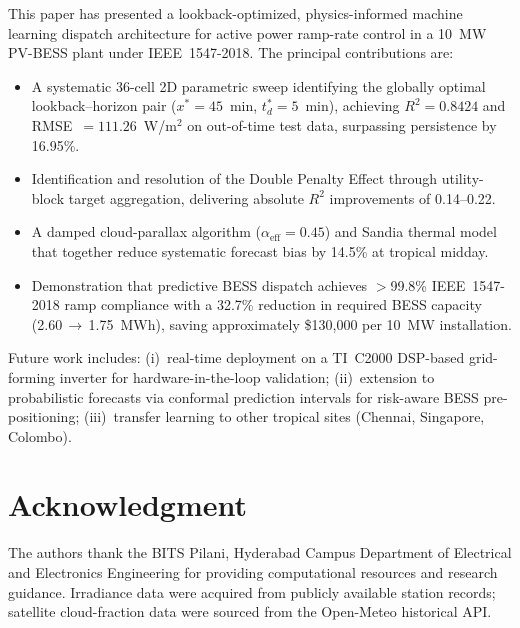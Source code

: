 \documentclass[conference]{IEEEtran}
\begin{document}
This paper has presented a lookback-optimized, physics-informed machine learning
dispatch architecture for active power ramp-rate control in a 10~MW PV-BESS
plant under IEEE~1547-2018. The principal contributions are:
\begin{itemize}
  \item A systematic 36-cell 2D parametric sweep identifying the globally
        optimal lookback--horizon pair ($x^*=45$~min, $t_d^*=5$~min),
        achieving $R^2=0.8424$ and RMSE~$=111.26$~W/m$^2$ on out-of-time
        test data, surpassing persistence by 16.95\%.
  \item Identification and resolution of the Double Penalty Effect through
        utility-block target aggregation, delivering absolute $R^2$
        improvements of 0.14--0.22.
  \item A damped cloud-parallax algorithm ($\alpha_{\mathrm{eff}}=0.45$) and
        Sandia thermal model that together reduce systematic forecast bias
        by 14.5\% at tropical midday.
  \item Demonstration that predictive BESS dispatch achieves $>$99.8\%
        IEEE~1547-2018 ramp compliance with a 32.7\% reduction in required
        BESS capacity (2.60\,$\to$\,1.75~MWh), saving approximately
        \$130,000 per 10~MW installation.
\end{itemize}

Future work includes: (i)~real-time deployment on a TI~C2000 DSP-based
grid-forming inverter for hardware-in-the-loop validation;
(ii)~extension to probabilistic forecasts via conformal prediction intervals
for risk-aware BESS pre-positioning;
(iii)~transfer learning to other tropical sites (Chennai, Singapore, Colombo).

\section*{Acknowledgment}

The authors thank the BITS Pilani, Hyderabad Campus Department of Electrical
and Electronics Engineering for providing computational resources and research
guidance. Irradiance data were acquired from publicly available station records;
satellite cloud-fraction data were sourced from the Open-Meteo historical API.
\end{document}
